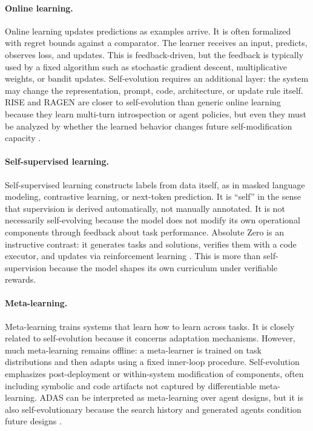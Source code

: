 \paragraph{Online learning.} Online learning updates predictions as examples arrive. It is often formalized with regret bounds against a comparator. The learner receives an input, predicts, observes loss, and updates. This is feedback-driven, but the feedback is typically used by a fixed algorithm such as stochastic gradient descent, multiplicative weights, or bandit updates. Self-evolution requires an additional layer: the system may change the representation, prompt, code, architecture, or update rule itself. RISE and RAGEN are closer to self-evolution than generic online learning because they learn multi-turn introspection or agent policies, but even they must be analyzed by whether the learned behavior changes future self-modification capacity \cite{qu2024rise,wang2025ragen}.

\paragraph{Self-supervised learning.} Self-supervised learning constructs labels from data itself, as in masked language modeling, contrastive learning, or next-token prediction. It is ``self'' in the sense that supervision is derived automatically, not manually annotated. It is not necessarily self-evolving because the model does not modify its own operational components through feedback about task performance. Absolute Zero is an instructive contrast: it generates tasks and solutions, verifies them with a code executor, and updates via reinforcement learning \cite{absolutezero2025}. This is more than self-supervision because the model shapes its own curriculum under verifiable rewards.

\paragraph{Meta-learning.} Meta-learning trains systems that learn how to learn across tasks. It is closely related to self-evolution because it concerns adaptation mechanisms. However, much meta-learning remains offline: a meta-learner is trained on task distributions and then adapts using a fixed inner-loop procedure. Self-evolution emphasizes post-deployment or within-system modification of components, often including symbolic and code artifacts not captured by differentiable meta-learning. ADAS can be interpreted as meta-learning over agent designs, but it is also self-evolutionary because the search history and generated agents condition future designs \cite{adas2025}.

